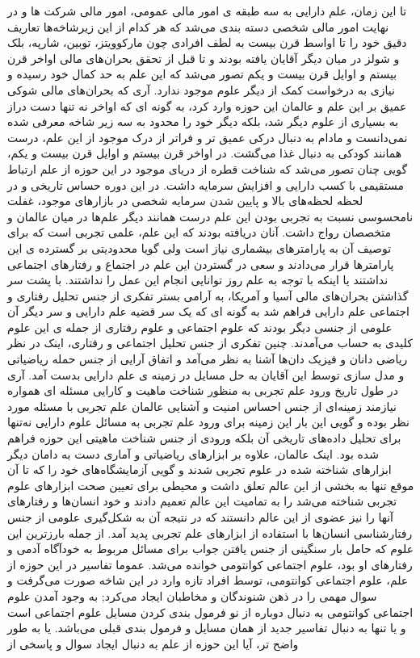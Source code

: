\documentclass[a4paper,titlepage,12pt,fleqn,oneside]{report}
\begin{document}
تا این زمان، علم  دارایی به سه طبقه ی امور مالی عمومی، امور مالی شرکت ها و در نهایت امور مالی شخصی دسته بندی می‌شد که هر کدام از این زیرشاخه‌ها تعاریف دقیق خود را تا اواسط قرن بیست به لطف افرادی چون مارکوویتز، توبین، شارپه، بلک و شولز در میان دیگر آقایان یافته بودند و تا قبل از تحقق بحران‌های مالی اواخر قرن بیستم و اوایل قرن بیست و یکم تصور می‌شد که این علم به حد کمال خود رسیده و نیازی به درخواست کمک از دیگر علوم موجود ندارد. آری که بحران‌های مالی شوکی عمیق بر این علم و عالمان این حوزه وارد کرد، به گونه ای که اواخر نه تنها دست دراز به بسیاری از علوم دیگر شد، بلکه دیگر خود را محدود به سه زیر شاخه معرفی شده نمی‌دانست و مادام به دنبال درکی عمیق تر و فراتر از درک موجود از این علم، درست همانند کودکی به دنبال غذا می‌گشت. در اواخر قرن بیستم و اوایل قرن بیست و یکم، گویی چنان تصور می‌شد که شناخت قطره از دریای موجود در این حوزه از علم ارتباط مستقیمی با کسب دارایی و افزایش سرمایه داشت. در این دوره حساس تاریخی و در لحظه لحظه‌های بالا و پایین شدن سرمایه شخصی در بازارهای موجود، غفلت نامحسوسی نسبت به تجربی بودن این علم درست همانند دیگر علم‌ها در میان عالمان و متخصصان رواج داشت. آنان دریافته بودند که این علم، علمی تجربی است که برای توصیف آن به پارامترهای بیشماری نیاز است ولی گویا محدودیتی بر گسترده ی این پارامترها قرار می‌دادند و سعی در گستردن این علم در اجتماع و رفتارهای اجتماعی نداشتند یا اینکه با توجه به علم روز توانایی انجام این عمل را نداشتند. با پشت سر گذاشتن بحران‌های مالی آسیا و آمریکا، به آرامی بستر تفکری از جنس تحلیل رفتاری و اجتماعی علم دارایی فراهم شد به گونه ای که یک سر قضیه علم دارایی و سر دیگر آن علومی از جنسی دیگر بودند که علوم اجتماعی و علوم رفتاری از جمله ی این علوم کلیدی به حساب می‌آمدند. چنین تفکری از جنس تحلیل اجتماعی و رفتاری، اینک در نظر ریاضی دانان و فیزیک دان‌ها آشنا به نظر می‌آمد و اتفاق آرایی از جنس حمله ریاضیاتی و مدل سازی توسط این آقایان به حل مسايل در زمینه ی علم دارایی بدست آمد. آری در طول تاریخ ورود علم تجربی به منظور شناخت ماهیت و کارایی مسئله ای همواره نیازمند زمینه‌ای از جنس احساس امنیت و آشنایی عالمان علم تجربی با مسئله مورد نظر بوده و گویی این بار این زمینه برای ورود علم تجربی به مسائل علوم دارایی نه‌تنها برای تحلیل داده‌های تاریخی آن بلکه ورودی از جنس شناخت ماهیتی این حوزه فراهم شده بود. اینک عالمان، علاوه بر ابزارهای ریاضیاتی و آماری دست به دامان دیگر ابزارهای شناخته شده در علوم تجربی شدند و گویی آزمایشگاه‌های خود را که تا آن موقع تنها به بخشی از این عالم تعلق داشت و محیطی برای تعیین صحت ابزارهای علوم تجربی شناخته می‌شد را به تمامیت این عالم تعمیم دادند و خود انسان‌ها و رفتارهای آنها را نیز عضوی از این عالم دانستند که در نتیجه آن به شکل‌گیری علومی از جنس رفتارشناسی انسان‌ها با استفاده از ابزارهای علم تجربی پدید آمد.  از جمله بارزترین این علوم که حامل بار سنگینی از جنس یافتن جواب برای مسائل مربوط به خودآگاه آدمی و رفتارهای او بود، علوم اجتماعی کوانتومی خوانده می‌شد. عموما تفاسیر در این حوزه از علم، علوم اجتماعی کوانتومی، توسط افراد تازه وارد در این شاخه صورت می‌گرفت و سوال مهمی را در ذهن شنوندگان و مخاطبان ایجاد می‌کرد; به وجود آمدن علوم اجتماعی کوانتومی به دنبال دوباره از نو فرمول بندی کردن مسایل علوم اجتماعی است و یا تنها به دنبال تفاسیر جدید از همان مسایل و فرمول بندی  قبلی می‌باشد. یا به طور واضح تر، آیا این حوزه از علم به دنبال ایجاد سوال و پاسخی از 
\end{document}
